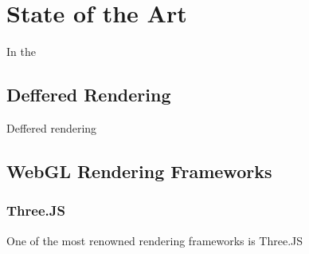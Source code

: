 \chapter{State of the Art}
\label{chapter:Chapter 2}


In the  

\section{Deffered Rendering}

Deffered rendering

\section{WebGL Rendering Frameworks}

\subsection{Three.JS}
 
One of the most renowned rendering frameworks is Three.JS


\section{}

\section{} 